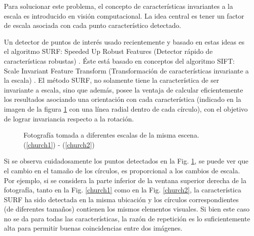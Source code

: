 \documentclass[a4paper,11pt,spanish]{article}
\begin{document}
Para solucionar este problema, el concepto de características invariantes a la escala es introducido en visión computacional. La idea central es tener un factor de escala asociada con cada punto característico detectado. 

Un detector de puntos de interés usado recientemente y basado en estas ideas es el algoritmo SURF: Speeded Up Robust Features (Detector rápido de características robustas) \cite{citeulike:9456628, citeulike:7676197, Bay:2008:SRF, bb53077, TuytelaarsM07, Bay:2008:SRF, BouGar}. Éste está basado en conceptos del algoritmo SIFT: Scale Invariant Feature Transform (Transformación de características invariante a la escala) \cite{citeulike:3484001, citeulike:9456628, citeulike:7676197, bb53077, journals/tvcg/WagnerRMDS10, TuytelaarsM07, bb48614, Nixon:2002:FEI, BouGar, 5739718, conf/ismar/SkrypnykL04}. El método SURF, no solamente tiene la característica de ser invariante a escala, sino que además, posee la ventaja de calcular eficientemente los resultados asociando una orientación con cada característica (indicado en la imagen de la figura \ref{church_difference_surf} con una línea radial dentro de cada círculo), con el objetivo de lograr invariancia respecto a la rotación.%


\begin{figure}[tbhp]
   \centering
   \hspace{0.1\linewidth}
    \caption{Fotografía tomada a diferentes escalas de la misma escena. (\ref{church1}) - (\ref{church2})}
   \label{church_difference_surf}                %
\end{figure}
%

Si se observa cuidadosamente los puntos detectados en la Fig. \ref{church_difference_surf}, se puede ver que el cambio en el tamaño de los círculos, es proporcional a los cambios de escala. Por ejemplo, si se considera la parte inferior de la ventana superior derecha de la fotografía, tanto en la Fig. \ref{church1} como en la Fig. \ref{church2}, la característica SURF ha sido detectada en la misma ubicación y los círculos correspondientes (de diferentes tamaños) contienen los mismos elementos visuales. Si bien este caso no se da para todas las características, la razón de repetición es lo suficientemente alta para permitir buenas coincidencias entre dos imágenes.
\end{document}
